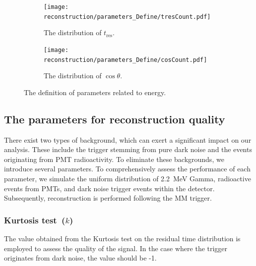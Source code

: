 \begin{figure}[htbp]
	\centering
	\begin{subfigure}{0.5\textwidth}
		\centering
		\texttt{[image: reconstruction/parameters\_Define/tresCount.pdf]}
		\caption{The distribution of $t_{\mathrm{res}}$.}
		\label{fig:n20def}
	\end{subfigure}%
	\begin{subfigure}{0.5\textwidth}
		\centering
		\texttt{[image: reconstruction/parameters\_Define/cosCount.pdf]}
		\caption{The distribution of $\cos\theta$.}
		\label{fig:nc}
	\end{subfigure}
	\caption{The definition of parameters related to energy.}
	\label{fig:dual}
\end{figure}

\subsection{The parameters for reconstruction quality}
There exist two types of background, which can exert a significant impact on our analysis. These include the trigger stemming from pure dark noise and the events originating from PMT radioactivity. To eliminate these backgrounds, we introduce several parameters. To comprehensively assess the performance of each parameter, we simulate the uniform distribution of \SI{2.2}{MeV} Gamma, radioactive events from PMTs, and dark noise trigger events within the detector. Subsequently, reconstruction is performed following the MM trigger.

\subsubsection{Kurtosis test~($k$)}
The value obtained from the Kurtosis test on the residual time distribution is employed to assess the quality of the signal. In the case where the trigger originates from dark noise, the value should be -1.

